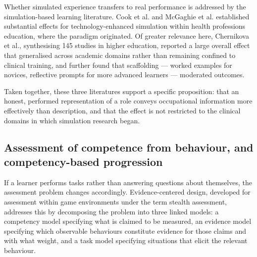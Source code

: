 Whether simulated experience transfers to real performance is addressed by the simulation-based learning literature. Cook et al.\cite{r17} and McGaghie et al.\cite{r18} established substantial effects for technology-enhanced simulation within health professions education, where the paradigm originated. Of greater relevance here, Chernikova et al.\cite{r19}, synthesising 145 studies in higher education, reported a large overall effect that generalised across academic domains rather than remaining confined to clinical training, and further found that scaffolding --- worked examples for novices, reflective prompts for more advanced learners --- moderated outcomes.

Taken together, these three literatures support a specific proposition: that an honest, performed representation of a role conveys occupational information more effectively than description, and that the effect is not restricted to the clinical domains in which simulation research began.

\subsection{Assessment of competence from behaviour, and competency-based progression}

If a learner performs tasks rather than answering questions about themselves, the assessment problem changes accordingly. Evidence-centered design, developed for assessment within game environments under the term stealth assessment\cite{r20}, addresses this by decomposing the problem into three linked models: a competency model specifying what is claimed to be measured, an evidence model specifying which observable behaviours constitute evidence for those claims and with what weight, and a task model specifying situations that elicit the relevant behaviour.

